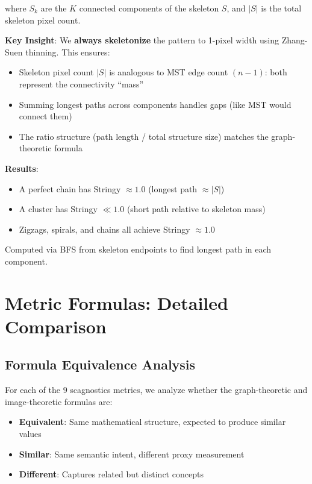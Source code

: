 \documentclass[11pt]{article}
\begin{document}
where $S_k$ are the $K$ connected components of the skeleton $S$, and $|S|$ is the total skeleton pixel count.

\textbf{Key Insight}: We \textbf{always skeletonize} the pattern to 1-pixel width using Zhang-Suen thinning. This ensures:
\begin{itemize}
    \item Skeleton pixel count $|S|$ is analogous to MST edge count $(n-1)$: both represent the connectivity ``mass''
    \item Summing longest paths across components handles gaps (like MST would connect them)
    \item The ratio structure (path length / total structure size) matches the graph-theoretic formula
\end{itemize}

\textbf{Results}:
\begin{itemize}
    \item A perfect chain has Stringy $\approx 1.0$ (longest path $\approx |S|$)
    \item A cluster has Stringy $\ll 1.0$ (short path relative to skeleton mass)
    \item Zigzags, spirals, and chains all achieve Stringy $\approx 1.0$
\end{itemize}

Computed via BFS from skeleton endpoints to find longest path in each component.

\section{Metric Formulas: Detailed Comparison}

\subsection{Formula Equivalence Analysis}

For each of the 9 scagnostics metrics, we analyze whether the graph-theoretic and image-theoretic formulas are:
\begin{itemize}
    \item \textcolor{equivalent}{\textbf{Equivalent}}: Same mathematical structure, expected to produce similar values
    \item \textcolor{similar}{\textbf{Similar}}: Same semantic intent, different proxy measurement
    \item \textcolor{different}{\textbf{Different}}: Captures related but distinct concepts
\end{itemize}
\end{document}
